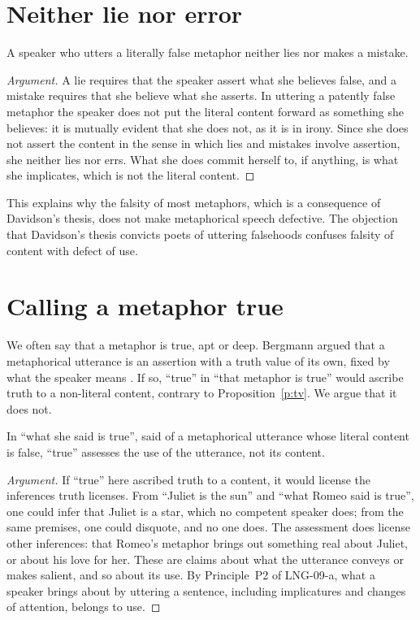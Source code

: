 \documentclass{situationist-preprint}
\begin{document}
\section{Neither lie nor error}

\begin{proposition}\label{p:nolie}
A speaker who utters a literally false metaphor neither lies nor makes a mistake.
\end{proposition}

\begin{proof}[Argument]
A lie requires that the speaker assert what she believes false, and a mistake requires that she believe what she asserts. In uttering a patently false metaphor the speaker does not put the literal content forward as something she believes: it is mutually evident that she does not, as it is in irony. Since she does not assert the content in the sense in which lies and mistakes involve assertion, she neither lies nor errs. What she does commit herself to, if anything, is what she implicates, which is not the literal content.
\end{proof}

This explains why the falsity of most metaphors, which is a consequence of Davidson's thesis, does not make metaphorical speech defective. The objection that Davidson's thesis convicts poets of uttering falsehoods confuses falsity of content with defect of use.

\section{Calling a metaphor true}

We often say that a metaphor is true, apt or deep. Bergmann argued that a metaphorical utterance is an assertion with a truth value of its own, fixed by what the speaker means \citep{Bergmann1982}. If so, \enquote{true} in \enquote{that metaphor is true} would ascribe truth to a non-literal content, contrary to Proposition~\ref{p:tv}. We argue that it does not.

\begin{proposition}\label{p:assess}
In \enquote{what she said is true}, said of a metaphorical utterance whose literal content is false, \enquote{true} assesses the use of the utterance, not its content.
\end{proposition}

\begin{proof}[Argument]
If \enquote{true} here ascribed truth to a content, it would license the inferences truth licenses. From \enquote{Juliet is the sun} and \enquote{what Romeo said is true}, one could infer that Juliet is a star, which no competent speaker does; from the same premises, one could disquote, and no one does. The assessment does license other inferences: that Romeo's metaphor brings out something real about Juliet, or about his love for her. These are claims about what the utterance conveys or makes salient, and so about its use. By Principle~P2 of LNG-09-a, what a speaker brings about by uttering a sentence, including implicatures and changes of attention, belongs to use.
\end{proof}
\end{document}
